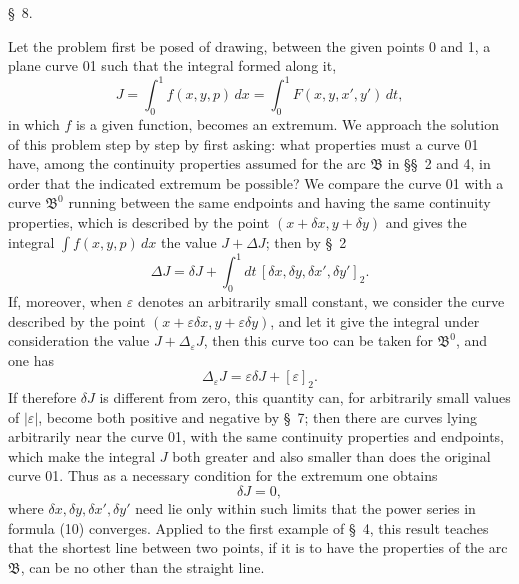 \documentclass[11pt,a4paper,leqno]{article}
\begin{document}
\begin{center}{\large \S~8.}\end{center}

Let the problem first be posed of drawing, between the given points 0 and 1, a plane curve 01 such that the integral formed along it,
\[
J=\int_0^1 f(x,y,p)\,dx=\int_0^1 F(x,y,x',y')\,dt,
\]
in which $f$ is a given function, becomes an extremum. We approach the solution of this problem step by step by first asking: what properties must a curve 01 have, among the continuity properties assumed for the arc $\mathfrak{B}$ in \S\S~2 and 4, in order that the indicated extremum be possible? We compare the curve 01 with a curve $\mathfrak{B}^0$ running between the same endpoints and having the same continuity properties, which is described by the point $(x+\delta x,y+\delta y)$ and gives the integral $\int f(x,y,p)\,dx$ the value $J+\Delta J$; then by \S~2
\begin{equation}\tag{10}
\Delta J=\delta J+\int_0^1 dt\,[\delta x,\delta y,\delta x',\delta y']_2.
\end{equation}
If, moreover, when $\varepsilon$ denotes an arbitrarily small constant, we consider the curve described by the point $(x+\varepsilon\delta x,y+\varepsilon\delta y)$, and let it give the integral under consideration the value $J+\Delta_\varepsilon J$, then this curve too can be taken for $\mathfrak{B}^0$,
and one has
\[
\Delta_\varepsilon J=\varepsilon\delta J+[\varepsilon]_2.
\]
If therefore $\delta J$ is different from zero, this quantity can, for arbitrarily small values of $|\varepsilon|$, become both positive and negative by \S~7; then there are curves lying arbitrarily near the curve 01, with the same continuity properties and endpoints, which make the integral $J$ both greater and also smaller than does the original curve 01. Thus as a necessary condition for the extremum one obtains
\begin{equation}\tag{11}
\delta J=0,
\end{equation}
where $\delta x,\delta y,\delta x',\delta y'$ need lie only within such limits that the power series in formula (10) converges. Applied to the first example of \S~4, this result teaches that the shortest line between two points, if it is to have the properties of the arc $\mathfrak{B}$, can be no other than the straight line.
\end{document}
